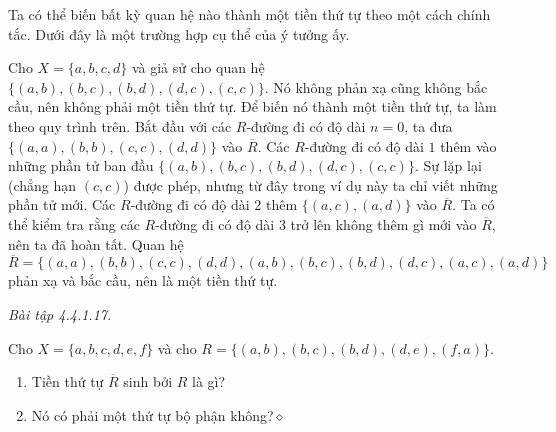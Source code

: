 Ta có thể biến bất kỳ quan hệ nào thành một tiền thứ tự theo một cách chính tắc. Dưới đây là một trường hợp cụ thể của ý tưởng ấy.

Cho $X=\{a,b,c,d\}$ và giả sử cho quan hệ $\{(a,b),(b,c),(b,d),(d,c),(c,c)\}$. Nó không phản xạ cũng không bắc cầu, nên không phải một tiền thứ tự. Để biến nó thành một tiền thứ tự, ta làm theo quy trình trên. Bắt đầu với các $R$-đường đi có độ dài $n=0$, ta đưa $\{(a,a),(b,b),(c,c),(d,d)\}$ vào $\overline{R}$. Các $R$-đường đi có độ dài $1$ thêm vào những phần tử ban đầu $\{(a,b),(b,c),(b,d),(d,c),(c,c)\}$. Sự lặp lại (chẳng hạn $(c,c)$) được phép, nhưng từ đây trong ví dụ này ta chỉ viết những phần tử mới. Các $R$-đường đi có độ dài $2$ thêm $\{(a,c),(a,d)\}$ vào $\overline{R}$. Ta có thể kiểm tra rằng các $R$-đường đi có độ dài $3$ trở lên không thêm gì mới vào $\overline{R}$, nên ta đã hoàn tất. Quan hệ
\[
\overline{R}=\{(a,a),(b,b),(c,c),(d,d),(a,b),(b,c),(b,d),(d,c),(a,c),(a,d)\}
\]
phản xạ và bắc cầu, nên là một tiền thứ tự.

\noindent\textit{Bài tập 4.4.1.17.}\keepwithnext

Cho $X=\{a,b,c,d,e,f\}$ và cho $R=\{(a,b),(b,c),(b,d),(d,e),(f,a)\}$.
\begin{enumerate}[label=\alph*.]
\item Tiền thứ tự $\overline{R}$ sinh bởi $R$ là gì?
\item Nó có phải một thứ tự bộ phận không?\nobreak\hfill$\diamond$
\end{enumerate}
